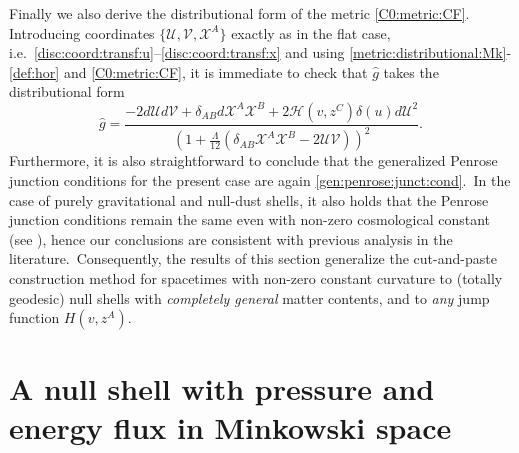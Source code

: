 \documentclass[11pt]{article}
\numberwithin{equation}{section}
\newcommand{\cx}{\mathcal{X}}
\newcommand{\lp}{\left(}
\newcommand{\rp}{\right)}
\newcommand{\cu}{\mathcal{U}}
\newcommand{\cv}{\mathcal{V}}
\newcommand{\tcte}{}%
\newcommand{\hor}{\mathscr{H}}
\begin{document}
Finally we also derive the distributional form of the metric \eqref{C0:metric:CF}. Introducing coordinates $\{\cu,\cv,\cx^A\}$ exactly as in the flat case, i.e.\ \eqref{disc:coord:transf:u}--\eqref{disc:coord:transf:x} and using \eqref{metric:distributional:Mk}-\eqref{def:hor} and \eqref{C0:metric:CF}, it is immediate to check that $\hat g$ takes the  distributional form 
\begin{equation}
	\label{metric:distributional:CF}
	\hat g=\frac{-2d\cu d\cv+\delta_{AB}d\cx^A \cx^B+2\tcte{\hor(v,z^C)\delta(u)} d\cu^2}{\lp 1+\frac{\Lambda}{12}\lp \delta_{AB}\cx^A\cx^B-2\cu\cv\rp\rp^2}.
\end{equation}
Furthermore, it is also straightforward to conclude that the generalized Penrose junction conditions for the present case 
are again \eqref{gen:penrose:junct:cond}.\ 
In the case of purely gravitational and null-dust shells, it also holds that the Penrose junction conditions remain the same even with non-zero cosmological constant (see \cite{podolsky2019cut,PS:22,podolsky2017penrose,samann2023cut}), hence our conclusions are consistent with previous analysis in the literature.\ Consequently, the results of this section generalize the cut-and-paste construction method for 
spacetimes with non-zero constant curvature 
to (totally geodesic) null shells with \textit{completely general} matter contents, and to \textit{any} jump function $H(v,z^A)$.\ 





\section{A null shell with pressure and energy flux in Min\-kows\-ki space}\label{sec:ex:pressure:Mk:new}
\end{document}
